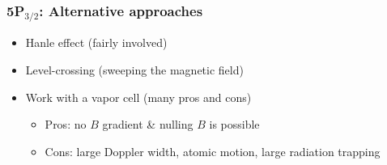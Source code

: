 \documentclass{beamer}
\theoremstyle{definition}
\begin{document}
\begin{frame}
\frametitle{5P$_{\text{3/2}}$: Alternative approaches}

\begin{itemize}
	\item Hanle effect (fairly involved)
	\item Level-crossing (sweeping the magnetic field)
	\item Work with a vapor cell (many pros and cons)
	\begin{itemize}
		\item Pros: no $B$ gradient \& nulling $B$ is possible
		
		\item Cons: large Doppler width, atomic motion, large radiation trapping 
	\end{itemize}
\end{itemize}


\end{frame}





%
\end{document}
